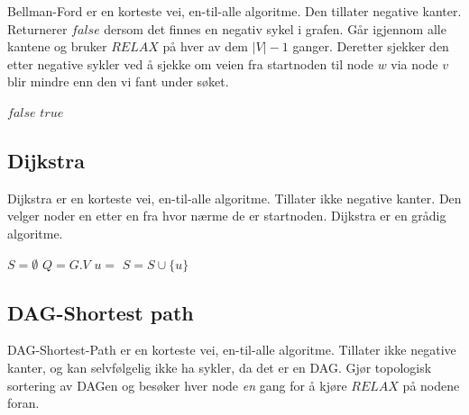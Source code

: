 \documentclass[a4paper, norsk,  10pt]{article}
\begin{document}
{{\begin{algorithmic}
Bellman-Ford er en korteste vei, en-til-alle algoritme. Den tillater negative kanter. Returnerer $false$ dersom det finnes en negativ sykel i grafen. Går igjennom alle kantene og bruker $RELAX$ på hver av dem $|V|-1$ ganger. Deretter sjekker den etter negative sykler ved å sjekke om veien fra startnoden til node $w$ via node $v$ blir mindre enn den vi fant under søket. \\ \hfill

\begin{algoritmic}
\State {}
		\State {}
	\EndFor
\EndFor
{}
		\State \Return $false$
	\EndIf
\EndFor
\State \Return $true$
\EndFunction

\end{algoritmic}

\subsection{Dijkstra}

Dijkstra er en korteste vei, en-til-alle algoritme. Tillater ikke negative kanter. Den velger noder en etter en fra hvor nærme de er startnoden. Dijkstra er en grådig algoritme. \\ \hfill

\begin{algoritmic}
\State {}
\State $S = \emptyset$
\State $Q = G.V$
	\State $u = $ 
	\State $S = S \cup \{u\}$
		\State {}
	\EndFor
\EndWhile
\EndFunction

\end{algoritmic}

\subsection{DAG-Shortest path}

DAG-Shortest-Path er en korteste vei, en-til-alle algoritme. Tillater ikke negative kanter, og kan selvfølgelig ikke ha sykler, da det er en DAG. Gjør topologisk sortering av DAGen og besøker hver node \textit{en} gang for å kjøre $RELAX$ på nodene foran. \\ \hfill

\begin{algoritmic}
\State {}
\State {}
		\State {}
	\EndFor
\EndFor
\EndFunction
\end{algoritmic}


\end{algorithmic}}}
\end{document}
